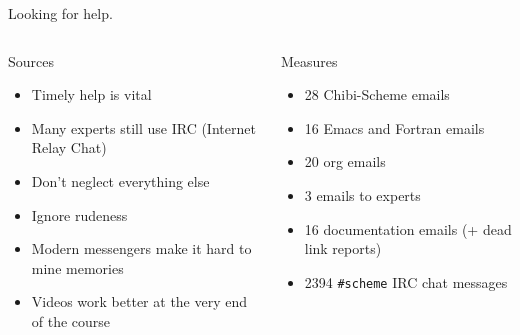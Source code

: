 \documentclass[presentation, CJK, compress,aspectratio=169]{beamer}
\begin{document}
\begin{frame}[label={sec:orgab1cd90},fragile]{Looking for help.}
 \begin{columns}[t]
\begin{column}{0.5\columnwidth}
\begin{block}{Sources}
\begin{itemize}
\item Timely help is vital
\item Many experts still use IRC (Internet Relay Chat)
\item Don't neglect everything else
\item Ignore rudeness
\item Modern messengers make it hard to mine memories
\item Videos work better at the very end of the course
\end{itemize}
\end{block}
\end{column}

\begin{column}{0.5\columnwidth}
\begin{block}{Measures}
\begin{itemize}
\item 28 Chibi-Scheme emails
\item 16 Emacs and Fortran emails
\item 20 org emails
\item 3 emails to experts
\item 16 documentation emails (+ dead link reports)
\item 2394 \texttt{\#scheme} IRC chat messages
\end{itemize}
\end{block}
\end{column}
\end{columns}

\end{frame}
\end{document}
